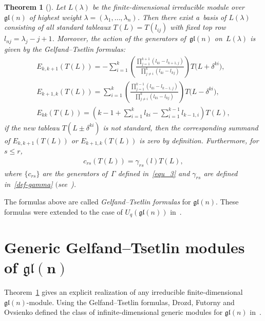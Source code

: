 \documentclass[pdftex]{sigma}
\numberwithin{equation}{section}
\newtheorem{Theorem}{Theorem}[section]
\begin{document}
\begin{Theorem}[\cite{GT}]\label{Gelfand--Tsetlin theorem}
Let $L(\lambda)$ be the finite-dimensional irreducible module over $\mathfrak{gl}(n)$ of highest weight
$\lambda=(\lambda_{1},\ldots,\lambda_{n})$.
Then there exist a~basis of $L(\lambda)$ consisting of all standard tableaux $T(L) = T(l_{ij})$ with fixed top row
$l_{nj}=\lambda_j-j+1$.
Moreover, the action of the generators of~$\mathfrak{gl}(n)$ on~$L(\lambda)$ is given by the Gelfand--Tsetlin
formulas:
\begin{gather}
E_{k,k+1}(T(L)) =-\sum\limits_{i=1}^{k}\left(\frac{\prod\limits_{j=1}^{k+1}(l_{ki}-l_{k+1,j})}{\prod\limits_{j\neq
i}^{k}(l_{ki}-l_{kj})}\right)T\big(L+\delta^{ki}\big),
\nonumber
\\
E_{k+1,k}(T(L)) =\sum\limits_{i=1}^{k}\left(\frac{\prod\limits_{j=1}^{k-1}(l_{ki}-l_{k-1,j})}{\prod\limits_{j\neq
i}^{k}(l_{ki}-l_{kj})}\right)T\big(L-\delta^{ki}\big),
\nonumber
\\
E_{kk}(T(L)) =\left(k-1+\sum\limits_{i=1}^{k}l_{ki}-\sum\limits_{i=1}^{k-1}l_{k-1,i}\right)T(L),
\label{Gelfand--Tsetlin formulas}
\end{gather}
if the new tableau $T(L\pm\delta^{ki})$ is not standard, then the corresponding summand of $E_{k,k+1}(T(L))$ or
$E_{k+1,k}(T(L))$ is zero by definition.
Furthermore, for $s\leq r$,
\begin{gather}
\label{action of Gamma in finite dimensional modules}
c_{rs}(T(L))=\gamma_{rs}(l)T(L),
\end{gather}
where $\{c_{rs}\}$ are the generators of~$\Gamma$ defined in~\eqref{equ_3} and $\gamma_{rs}$ are defined
in~\eqref{def-gamma} $($see~{\rm \cite{Zh})}.
\end{Theorem}
\noindent The formulas above are called \emph{Gelfand--Tsetlin formulas} for $\mathfrak{gl}(n)$.
These formulas were extended to the case of $U_{q}(\mathfrak{gl}(n))$ in~\cite{Tar-Naz}.

\section[Generic Gelfand--Tsetlin modules of $\mathfrak{gl}(n)$]{Generic Gelfand--Tsetlin modules of $\boldsymbol{\mathfrak{gl}(n)}$}
\label{section5}

Theorem~\ref{Gelfand--Tsetlin theorem} gives an explicit realization of any irreducible f\/inite-dimensional
$\mathfrak{gl}(n)$-module.
Using the Gelfand--Tsetlin formulas, Drozd, Futorny and Ovsienko def\/ined the class of inf\/inite-dimensional generic
modules for $\mathfrak{gl}(n)$ in~\cite{DFO3}.
\end{document}
